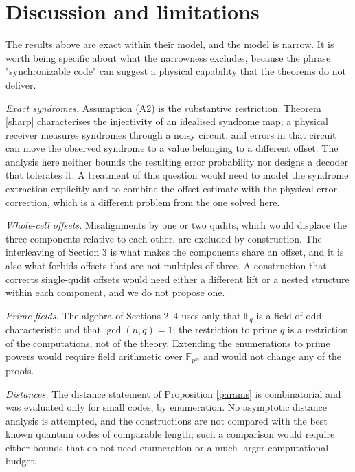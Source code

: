 \documentclass[11pt,reqno]{amsart}
\theoremstyle{definition}
\theoremstyle{remark}
\newcommand{\F}{\mathbb{F}}
\begin{document}
\section{Discussion and limitations}\label{sec:discussion-and-limitations}

The results above are exact within their model, and the model is narrow. It is worth being specific about what the narrowness excludes, because the phrase "synchronizable code" can suggest a physical capability that the theorems do not deliver.


\emph{Exact syndromes.} Assumption (A2) is the substantive restriction. Theorem \ref{sharp} characterises the injectivity of an idealised syndrome map; a physical receiver measures syndromes through a noisy circuit, and errors in that circuit can move the observed syndrome to a value belonging to a different offset. The analysis here neither bounds the resulting error probability nor designs a decoder that tolerates it. A treatment of this question would need to model the syndrome extraction explicitly and to combine the offset estimate with the physical-error correction, which is a different problem from the one solved here.


\emph{Whole-cell offsets.} Misalignments by one or two qudits, which would displace the three components relative to each other, are excluded by construction. The interleaving of Section 3 is what makes the components share an offset, and it is also what forbids offsets that are not multiples of three. A construction that corrects single-qudit offsets would need either a different lift or a nested structure within each component, and we do not propose one.


\emph{Prime fields.} The algebra of Sections 2--4 uses only that $\F_q$ is a field of odd characteristic and that $\gcd(n,q)=1$; the restriction to prime $q$ is a restriction of the computations, not of the theory. Extending the enumerations to prime powers would require field arithmetic over $\F_{p^m}$ and would not change any of the proofs.


\emph{Distances.} The distance statement of Proposition \ref{params} is combinatorial and was evaluated only for small codes, by enumeration. No asymptotic distance analysis is attempted, and the constructions are not compared with the best known quantum codes of comparable length; such a comparison would require either bounds that do not need enumeration or a much larger computational budget.
\end{document}
